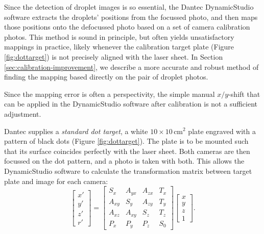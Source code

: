 \documentclass[11.5pt]{book}
\begin{document}
Since the detection of droplet images is so essential, the Dantec DynamicStudio
software extracts the droplets' positions from the focussed photo, and then maps
those positions onto the defocussed photo based on a set of camera calibration
photos. This method is sound in principle, but often yields unsatisfactory
mappings in practice, likely whenever the calibration target plate (Figure
\ref{fig:dottarget}) is not precisely aligned with the laser sheet. In Section
\ref{sec:calibration-improvement}, we describe a more accurate and robust method
of finding the mapping based directly on the pair of droplet photos. 

Since the mapping error is often a perspectivity, the simple manual
$x/y$-shift that can be applied in the DynamicStudio software after calibration
is not a sufficient adjustment.

Dantec supplies a \emph{standard dot target}, a white $10 \times 10\,
\mathrm{cm}^2$ plate engraved with a pattern of black dots (Figure
\ref{fig:dottarget}). The plate is to be mounted such that its surface coincides
perfectly with the laser sheet. Both cameras are then focussed on the dot
pattern, and a photo is taken with both. This allows the DynamicStudio software
to calculate the transformation matrix between target plate and
image for each camera:
\begin{equation}
\left[\begin{array}{c} x'\\ y'\\ z'\\ r' \end{array} \right]
=
\left[ \begin{array}{cccc}
S_x & A_{yx} & A_{zx} & T_x \\
A_{xy} & S_y & A_{zy} & T_y \\
A_{xz} & A_{xy} & S_z & T_z \\
P_x & P_y & P_z & S_0
\end{array} \right]
\left[ \begin{array}{c} x\\ y \\ z \\ 1 \end{array} \right].
\end{equation}
\end{document}
